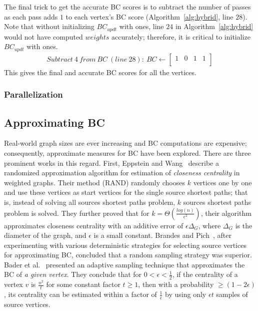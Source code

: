 %
The final trick to get the accurate BC scores is to subtract the number of
passes as each pass adds $1$ to each vertex's BC score
(Algorithm~\ref{alg:hybrid}, line $28$).
%
Note that without initializing $BC_{updt}$ with ones, line $24$ in
Algorithm~\ref{alg:hybrid} would not have computed $weights$ accurately;
therefore, it is critical to initialize $BC_{updt}$ with ones.
%
\begin{align*}
Subtract\ 4\ from\ BC\ (line\ 28):\ 
BC\leftarrow{}\left[\begin{array}{cccc}1 & 0 & 1 & 1 \\\end{array} \right]
\end{align*}
%
This gives the final and accurate BC scores for all the vertices.
%

%
%
\subsubsection{Parallelization}
%

%
%
\subsection{Approximating BC}
\label{subsec:approximate_bc}
%
Real-world graph sizes are ever increasing and BC computations are expensive;
consequently, approximate measures for BC have been explored.
%
There are three prominent works in this regard.
%
First, Eppstein and Wang~\cite{Eppstein-2004} describe a randomized
approximation algorithm for estimation of \textit{closeness centrality} in
weighted graphs.
%
Their method (RAND) randomly chooses $k$ vertices one by one and use these 
vertices as start vertices for the single source shortest paths; that is, 
instead of solving all sources shortest paths problem, $k$ sources shortest
paths problem is solved.
%
They further proved that for $k=\Theta{(\frac{log(n)}{\epsilon{}^2})}$, their
algorithm approximates closeness centrality with an additive error of
$\epsilon{}\Delta{}_{G}$, where $\Delta{}_G$ is the diameter of the graph, and
$\epsilon{}$ is a small constant.
%
Brandes and Pich~\cite{brandes-2007}, after experimenting with various 
deterministic strategies for selecting source vertices for approximating BC,
concluded that a random sampling strategy was superior.
%
Bader et al.~\cite{Bader07:ApproxBC} presented an adaptive sampling technique
that approximates the BC of \textit{a given vertex}.
%
They conclude that for $0<\epsilon{}<\frac{1}{2}$, if the centrality of a vertex
$v$ is $\frac{n^2}{t}$ for some constant factor $t\ge{}1$, then with a 
probability $\ge{}(1-2\epsilon{})$, its centrality can be estimated within a 
factor of $\frac{1}{\epsilon{}}$ by using only $\epsilon{}t$ samples of 
source vertices.
%

